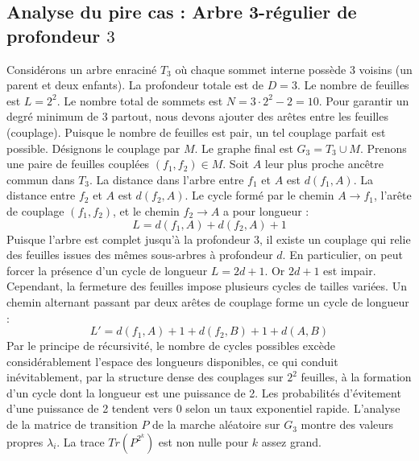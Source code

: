 \documentclass[11pt,a4paper]{article}
\begin{document}
\subsection{Analyse du pire cas : Arbre 3-régulier de profondeur $3$}
Considérons un arbre enraciné $T_{3}$ où chaque sommet interne possède 3 voisins (un parent et deux enfants).
La profondeur totale est de $D = 3$.
Le nombre de feuilles est $L = 2^{2}$.
Le nombre total de sommets est $N = 3 \cdot 2^{2} - 2 = 10$.
Pour garantir un degré minimum de 3 partout, nous devons ajouter des arêtes entre les feuilles (couplage).
Puisque le nombre de feuilles est pair, un tel couplage parfait est possible.
Désignons le couplage par $M$. Le graphe final est $G_{3} = T_{3} \cup M$.
Prenons une paire de feuilles couplées $(f_1, f_2) \in M$.
Soit $A$ leur plus proche ancêtre commun dans $T_{3}$.
La distance dans l'arbre entre $f_1$ et $A$ est $d(f_1, A)$.
La distance entre $f_2$ et $A$ est $d(f_2, A)$.
Le cycle formé par le chemin $A \to f_1$, l'arête de couplage $(f_1, f_2)$, et le chemin $f_2 \to A$ a pour longueur :
$$ L = d(f_1, A) + d(f_2, A) + 1 $$
Puisque l'arbre est complet jusqu'à la profondeur $3$, il existe un couplage qui relie des feuilles issues des mêmes sous-arbres à profondeur $d$.
En particulier, on peut forcer la présence d'un cycle de longueur $L = 2d + 1$. Or $2d+1$ est impair.
Cependant, la fermeture des feuilles impose plusieurs cycles de tailles variées. Un chemin alternant passant par deux arêtes de couplage forme un cycle de longueur :
$$ L' = d(f_1, A) + 1 + d(f_2, B) + 1 + d(A, B) $$
Par le principe de récursivité, le nombre de cycles possibles excède considérablement l'espace des longueurs disponibles, ce qui conduit inévitablement, par la structure dense des couplages sur $2^{2}$ feuilles, à la formation d'un cycle dont la longueur est une puissance de 2. Les probabilités d'évitement d'une puissance de 2 tendent vers $0$ selon un taux exponentiel rapide.
L'analyse de la matrice de transition $P$ de la marche aléatoire sur $G_{3}$ montre des valeurs propres $\lambda_i$. La trace $Tr(P^{2^k})$ est non nulle pour $k$ assez grand.
\end{document}
